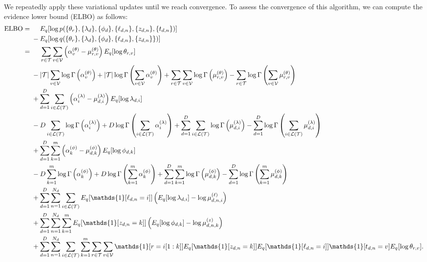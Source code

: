 \documentclass{article}
\newcommand{\indicator}{\mathds{1}}
\begin{document}
We repeatedly apply these variational updates until we reach convergence.
To assess the convergence of this algorithm, we can compute the evidence lower bound (ELBO) as follows:
\begin{align}
\text{ELBO}
={}& \phantom{{}-{}} E_q[\log p(\{\theta_r\}, \{\lambda_d\}, \{\phi_d\}, \{\ell_{d,n}\}, \{z_{d,n}\}, \{t_{d,n}\})] \\
& - E_q[\log q(\{\theta_r\}, \{\lambda_d\}, \{\phi_d\}, \{\ell_{d,n}\}, \{z_{d,n}\}\})] \nonumber \\
={}& \phantom{{}+{}} \sum_\rPath \sum_\vVocab \left(\alpha^{(\theta)}_v - \mu^{(\theta)}_{r,v}\right) E_q[\log \theta_{r,v}] \\
&- |\mathcal T| \sum_\vVocab \log \Gamma\left( \alpha^{(\theta)}_{v} \right) + |\mathcal T| \log \Gamma\left( \sum_\vVocab \alpha^{(\theta)}_{v} \right)
 + \sum_\rPath \sum_\vVocab \log \Gamma\left( \mu^{(\theta)}_{r,v} \right) - \sum_\rPath \log \Gamma\left( \sum_\vVocab \mu^{(\theta)}_{r,v} \right) \nonumber \\
&+ \sum_\dDoc \sum_\iLeaf \left(\alpha^{(\lambda)}_i - \mu^{(\lambda)}_{d,i}\right) E_q[\log \lambda_{d,i}] \nonumber \\
&- D \sum_\iLeaf \log \Gamma\left( \alpha^{(\lambda)}_{i} \right) + D \log \Gamma\left( \sum_\iLeaf \alpha^{(\lambda)}_{i} \right)
 + \sum_\dDoc \sum_\iLeaf \log \Gamma\left( \mu^{(\lambda)}_{d,i} \right) - \sum_\dDoc \log \Gamma\left( \sum_\iLeaf \mu^{(\lambda)}_{d,i} \right) \nonumber \\
&+ \sum_\dDoc \sum_\kDepth \left(\alpha^{(\phi)}_k - \mu^{(\phi)}_{d,k}\right) E_q[\log \phi_{d,k}] \nonumber \\
&- D \sum_\kDepth \log \Gamma\left( \alpha^{(\phi)}_{k} \right) + D \log \Gamma\left( \sum_\kDepth \alpha^{(\phi)}_{k} \right)
 + \sum_\dDoc \sum_\kDepth \log \Gamma\left( \mu^{(\phi)}_{d,k} \right) - \sum_\dDoc \log \Gamma\left( \sum_\kDepth \mu^{(\phi)}_{d,k} \right) \nonumber \\
&+ \sum_\dDoc \sum_\nWordSlot \sum_\iLeaf E_q[\indicator[\ell_{d,n} = i]] \left(E_q[\log \lambda_{d,i}] - \log \mu^{(\ell)}_{d,n,i}\right) \nonumber \\
&+ \sum_\dDoc \sum_\nWordSlot \sum_\kDepth E_q[\indicator[z_{d,n} = k]] \left(E_q[\log \phi_{d,k}] - \log \mu^{(z)}_{d,n,k}\right) \nonumber \\
&+ \sum_\dDoc \sum_\nWordSlot \sum_\iLeaf \sum_\kDepth \sum_\rPath \sum_\vVocab \indicator[r = i[1:k]] E_q[\indicator[z_{d,n} = k]] E_q[\indicator[\ell_{d,n} = i]] \indicator[t_{d,n} = v] E_q[\log \theta_{r,v}]. \nonumber
\end{align}
\end{document}
